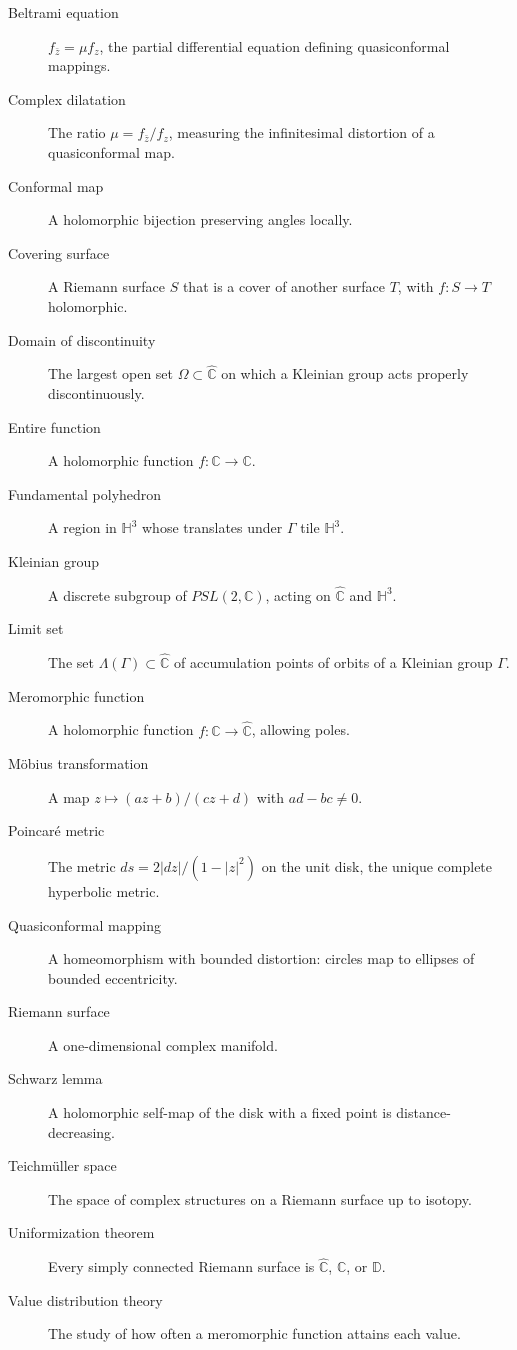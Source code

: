 \begin{description}
    \item[Beltrami equation] $f_{\bar z} = \mu f_z$, the partial differential equation defining quasiconformal mappings.
    \item[Complex dilatation] The ratio $\mu = f_{\bar z}/f_z$, measuring the infinitesimal distortion of a quasiconformal map.
    \item[Conformal map] A holomorphic bijection preserving angles locally.
    \item[Covering surface] A Riemann surface $S$ that is a cover of another surface $T$, with $f: S \to T$ holomorphic.
    \item[Domain of discontinuity] The largest open set $\Omega \subset \widehat{\mathbb{C}}$ on which a Kleinian group acts properly discontinuously.
    \item[Entire function] A holomorphic function $f: \mathbb{C} \to \mathbb{C}$.
    \item[Fundamental polyhedron] A region in $\mathbb{H}^3$ whose translates under $\Gamma$ tile $\mathbb{H}^3$.
    \item[Kleinian group] A discrete subgroup of $PSL(2,\mathbb{C})$, acting on $\widehat{\mathbb{C}}$ and $\mathbb{H}^3$.
    \item[Limit set] The set $\Lambda(\Gamma) \subset \widehat{\mathbb{C}}$ of accumulation points of orbits of a Kleinian group $\Gamma$.
    \item[Meromorphic function] A holomorphic function $f: \mathbb{C} \to \widehat{\mathbb{C}}$, allowing poles.
    \item[M\"{o}bius transformation] A map $z \mapsto (az + b)/(cz + d)$ with $ad - bc \neq 0$.
    \item[Poincar{\'e} metric] The metric $ds = 2|dz|/(1-|z|^2)$ on the unit disk, the unique complete hyperbolic metric.
    \item[Quasiconformal mapping] A homeomorphism with bounded distortion: circles map to ellipses of bounded eccentricity.
    \item[Riemann surface] A one-dimensional complex manifold.
    \item[Schwarz lemma] A holomorphic self-map of the disk with a fixed point is distance-decreasing.
    \item[Teichm{\"u}ller space] The space of complex structures on a Riemann surface up to isotopy.
    \item[Uniformization theorem] Every simply connected Riemann surface is $\widehat{\mathbb{C}}$, $\mathbb{C}$, or $\mathbb{D}$.
    \item[Value distribution theory] The study of how often a meromorphic function attains each value.
\end{description}

